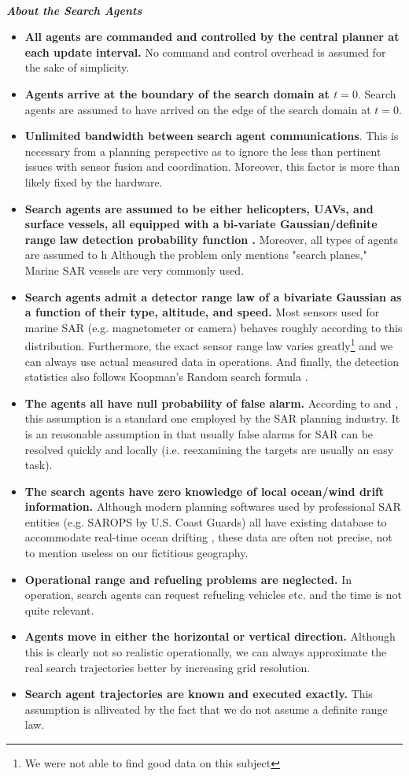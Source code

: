 \documentclass[12pt, letterpaper]{article}  %
\theoremstyle{definition}
\theoremstyle{remark}
\theoremstyle{plain}
\begin{document}
\ \\
\textit{\textbf{About the Search Agents}}
\begin{itemize}
\item \textbf{All agents are commanded and controlled by the central planner at each update interval.} No command and control overhead is assumed for the sake of simplicity.
\item \textbf{Agents arrive at the boundary of the search domain at $t=0$}.  Search agents are assumed to have arrived on the edge of the search domain at $t=0$.
\item \textbf{Unlimited bandwidth between search agent communications}.  This is necessary from a planning perspective as to ignore the less than pertinent issues with sensor fusion and coordination. Moreover, this factor is more than likely fixed by the hardware.
\item \textbf{Search agents are assumed to be either helicopters, UAVs, and surface vessels, all equipped with a bi-variate Gaussian/definite range law detection probability function \cite{heli} \cite{vessel}.} Moreover, all types of agents are assumed to h Although the problem only mentions "search planes," Marine SAR vessels are very commonly used.
\item \textbf{Search agents admit a detector range law of a bivariate Gaussian as a function of their type, altitude, and speed.} Most sensors used for marine SAR (e.g. magnetometer or camera) behaves roughly according to this distribution. Furthermore, the exact sensor range law varies greatly\footnote{We were not able to find good data on this subject} and we can always use actual measured data in operations. And finally, the detection statistics also follows Koopman's Random search formula \cite{46koopman}.
\item \textbf{The agents all have null probability of false alarm.} According to \cite{83stone} and \cite{13kagan}, this assumption is a standard one employed by the SAR planning industry. It is an reasonable assumption in that usually false alarms for SAR can be resolved quickly and locally (i.e. reexamining the targets are usually an easy task).
\item \textbf{The search agents have zero knowledge of local ocean/wind drift information.} Although modern planning softwares used by professional SAR entities (e.g. SAROPS by U.S. Coast Guards) all have existing database to accommodate real-time ocean drifting \cite{10uscg}, these data are often not precise, not to mention useless on our fictitious geography.
\item \textbf{Operational range and refueling problems are neglected.} In operation, search agents can request refueling vehicles etc. and the time is not quite relevant.
\item \textbf{Agents move in either the horizontal or vertical direction.} Although this is clearly not so realistic operationally, we can always approximate the real search trajectories better by increasing grid resolution.
\item \textbf{Search agent trajectories are known and executed exactly.} This assumption is alliveated by the fact that we do not assume a definite range law.


\end{itemize}
\end{document}

